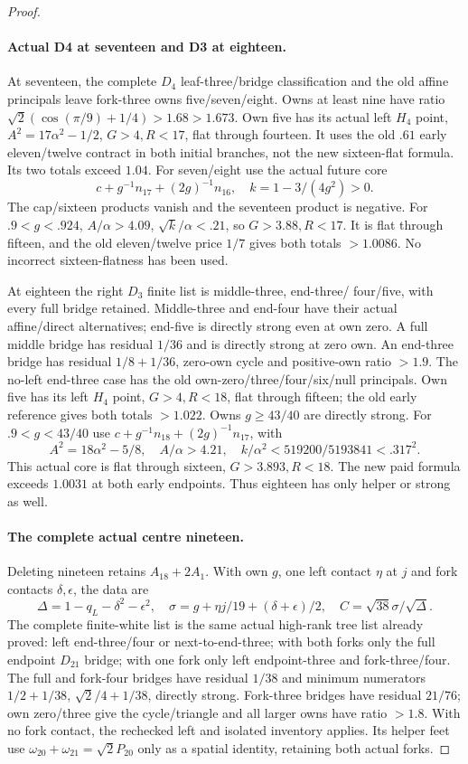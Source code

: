 \documentclass[11pt]{article}
\theoremstyle{definition}
\theoremstyle{remark}
\begin{document}
\begin{proof}
\paragraph{Actual D4 at seventeen and D3 at eighteen.}
At seventeen, the complete $D_4$ leaf-three/bridge classification
and the old affine principals leave fork-three owns five/seven/eight.
Owns at least nine have ratio
$\sqrt2(\cos(\pi/9)+1/4)>1.68>1.673$.
Own five has its actual left $H_4$ point,
$A^2=17\alpha^2-1/2$, $G>4,R<17$, flat through fourteen.
It uses the old $.61$ early eleven/twelve contract in both initial
branches, not the new sixteen-flat formula. Its two totals exceed
$1.04$. For seven/eight use the actual future core
\[
 c+g^{-1}n_{17}+(2g)^{-1}n_{16},\quad k=1-3/(4g^2)>0.
\]
The cap/sixteen products vanish and the seventeen product is negative.
For $.9<g<.924$, $A/\alpha>4.09$, $\sqrt{k}/\alpha<.21$,
so $G>3.88,R<17$. It is flat through fifteen, and the old
eleven/twelve price $1/7$ gives both totals $>1.0086$.
No incorrect sixteen-flatness has been used.

At eighteen the right $D_3$ finite list is middle-three, end-three/
four/five, with every full bridge retained. Middle-three and end-four
have their actual affine/direct alternatives; end-five is directly
strong even at own zero. A full middle bridge has residual $1/36$
and is directly strong at zero own. An end-three bridge has residual
$1/8+1/36$, zero-own cycle and positive-own ratio $>1.9$.
The no-left end-three case has the old own-zero/three/four/six/null
principals. Own five has its left $H_4$ point, $G>4,R<18$,
flat through fifteen; the old early reference gives both totals
$>1.022$. Owns $g\ge43/40$ are directly strong.
For $.9<g<43/40$ use
$c+g^{-1}n_{18}+(2g)^{-1}n_{17}$, with
\[
 A^2=18\alpha^2-5/8,\quad
 A/\alpha>4.21,\quad
 k/\alpha^2<519200/5193841<.317^2.
\]
This actual core is flat through sixteen, $G>3.893,R<18$.
The new paid formula exceeds $1.0031$ at both early endpoints.
Thus eighteen has only helper or strong as well.

\paragraph{The complete actual centre nineteen.}
Deleting nineteen retains $A_{18}+2A_1$. With own $g$, one left
contact $\eta$ at $j$ and fork contacts $\delta,\epsilon$, the
data are
\[
 \Delta=1-q_L-\delta^2-\epsilon^2,\quad
 \sigma=g+\eta j/19+(\delta+\epsilon)/2,\quad
 C=\sqrt{38}\sigma/\sqrt\Delta.
\]
The complete finite-white list is the same actual high-rank tree
list already proved: left end-three/four or next-to-end-three;
with both forks only the full endpoint $D_{21}$ bridge; with one
fork only left endpoint-three and fork-three/four.
The full and fork-four bridges have residual $1/38$ and minimum
numerators $1/2+1/38$, $\sqrt2/4+1/38$, directly strong.
Fork-three bridges have residual $21/76$; own zero/three give
the cycle/triangle and all larger owns have ratio $>1.8$.
With no fork contact, the rechecked left and isolated inventory
applies. Its helper feet use $\omega_{20}+\omega_{21}=\sqrt2P_{20}$
only as a spatial identity, retaining both actual forks.


\end{proof}
\end{document}
